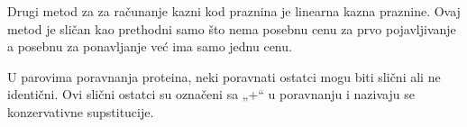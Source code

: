 Drugi metod za za računanje kazni kod praznina je linearna kazna praznine. Ovaj metod je sličan kao prethodni samo što nema posebnu cenu za prvo pojavljivanje a posebnu za ponavljanje već ima samo jednu cenu.
 
U parovima poravnanja proteina, neki poravnati ostatci mogu biti slični ali ne identični. Ovi slični ostatci su označeni sa „+“ u poravnanju i nazivaju se konzervativne supstitucije.